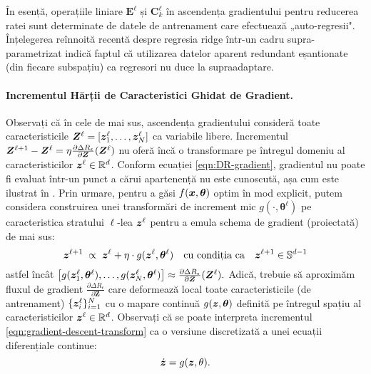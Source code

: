 \documentclass[../../book-main_ro.tex]{subfiles}
\begin{document}
\begin{remark}
În esență, operațiile liniare $\bm E^\ell$ și $\bm C_k^\ell$ în ascendența gradientului pentru reducerea ratei sunt determinate de datele de antrenament care efectuează „auto-regresii". Înțelegerea reînnoită recentă despre regresia ridge într-un cadru supra-parametrizat \cite{yang2020rethinking,Wu2020OnTO} indică faptul că utilizarea datelor aparent redundant eșantionate (din fiecare subspațiu) ca regresori nu duce la supraadaptare.
\end{remark}

\paragraph{Incrementul Hărții de Caracteristici Ghidat de Gradient.} Observați că în cele de mai sus, ascendența gradientului consideră toate caracteristicile $\bm{Z}^{\ell} = [\bm{z}^{\ell}_{1}, \dots, \bm{z}^{\ell}_{N}]$ ca variabile libere. Incrementul $\bm{Z}^{\ell+1} - \bm{Z}^{\ell} = \eta \frac{\partial \Delta R_{\epsilon}}{\partial \bm Z}(\bm{Z}^\ell)$ nu oferă încă o transformare pe întregul domeniu al caracteristicilor $\bm{z}^\ell \in \mathbb{R}^d$. Conform ecuației \eqref{eqn:DR-gradient}, gradientul nu poate fi evaluat într-un punct a cărui apartenență nu este cunoscută, așa cum este ilustrat în . Prin urmare, pentru a găsi $f(\bm{x},\bm  \theta)$ optim în mod explicit, putem considera construirea unei transformări de increment mic $g(\cdot, \bm{\theta}^{\ell})$ pe caracteristica stratului $\ell$-lea $\bm{z}^\ell$ pentru a emula schema de gradient (proiectată) de mai sus:
\begin{equation}
\bm{z}^{\ell + 1}   \; \propto \; \bm{z}^{\ell} + \eta\cdot  g(\bm{z}^{\ell}, \bm{\theta}^{\ell}) \quad \mbox{cu condiția ca} \quad \bm{z}^{\ell +1} \in \mathbb{S}^{d-1}
\label{eqn:gradient-descent-transform}
\end{equation}
astfel încât $\big[g(\bm{z}_1^{\ell}, \bm \theta^{\ell}), \ldots, g(\bm{z}_N^{\ell}, \bm \theta^{\ell}) \big] \approx \frac{\partial \Delta R_{\epsilon}}{\partial \bm Z}(\bm{Z}^\ell).$ Adică, trebuie să aproximăm fluxul de gradient $\frac{\partial \Delta R_{\epsilon}}{\partial \bm Z}$ care deformează local toate caracteristicile (de antrenament) $\{\bm{z}_i^\ell\}_{i=1}^N$ cu o mapare continuă $g(\bm{z},\bm \theta)$ definită pe întregul spațiu al caracteristicilor $\bm{z}^\ell \in \mathbb{R}^d$.  
Observați că se poate interpreta incrementul \eqref{eqn:gradient-descent-transform} ca o versiune discretizată a unei ecuații diferențiale continue:
\begin{equation}
\dot{\bm{z}} = g(\bm{z}, \theta).
\end{equation}
\end{document}
